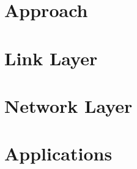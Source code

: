 \documentclass[10pt, letterpaper, twocolumn]{article}
\begin{document}
\section{Approach}



\section{Link Layer}


\section{Network Layer}


\section{Applications}
\end{document}
